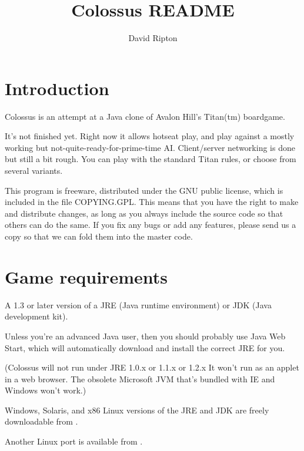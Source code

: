 \documentclass{article}
\begin{document}

\title{Colossus README}

\author{David Ripton}

\maketitle

\section*{Introduction}

Colossus is an attempt at a Java clone of Avalon Hill's Titan(tm) boardgame.

It's not finished yet. Right now it allows hotseat play, and play against a 
mostly working but not-quite-ready-for-prime-time AI. Client/server
networking is done but still a bit rough. You can play with the standard Titan
rules, or choose from several variants.

This program is freeware, distributed under the GNU public license, which is 
included in the file COPYING.GPL. This means that you have the right to make 
and distribute changes, as long as you always include the source code so that 
others can do the same. If you fix any bugs or add any features, please send 
us a copy so that we can fold them into the master code.

\section{Game requirements}

A 1.3 or later version of a JRE (Java runtime environment) or JDK (Java 
development kit). 

Unless you're an advanced Java user, then you should probably use Java Web 
Start, which will automatically download and install the correct JRE for you.

(Colossus will not run under JRE 1.0.x or 1.1.x or 1.2.x  It won't run as an 
applet in a web browser. The obsolete Microsoft JVM that's bundled with IE and 
Windows won't work.)

Windows, Solaris, and x86 Linux versions of the JRE and JDK are freely 
downloadable from .

Another Linux port is available from
.
\end{document}
